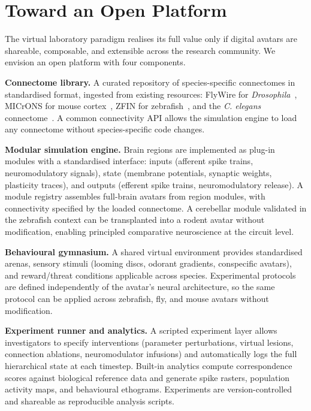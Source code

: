 \documentclass[12pt,a4paper]{article}
\begin{document}
\section*{Toward an Open Platform}

The virtual laboratory paradigm realises its full value only if
digital avatars are shareable, composable, and extensible across the
research community.
We envision an open platform with four components.

\textbf{Connectome library.}
A curated repository of species-specific connectomes in standardised
format, ingested from existing resources: FlyWire for
\textit{Drosophila}~\cite{dorkenwald2024}, MICrONS for mouse
cortex~\cite{microns2021}, ZFIN for zebrafish~\cite{bradford2022},
and the \textit{C. elegans} connectome~\cite{white1986}.
A common connectivity API allows the simulation engine to load any
connectome without species-specific code changes.

\textbf{Modular simulation engine.}
Brain regions are implemented as plug-in modules with a standardised
interface: inputs (afferent spike trains, neuromodulatory signals),
state (membrane potentials, synaptic weights, plasticity traces), and
outputs (efferent spike trains, neuromodulatory release).
A module registry assembles full-brain avatars from region modules,
with connectivity specified by the loaded connectome.
A cerebellar module validated in the zebrafish context can be
transplanted into a rodent avatar without modification, enabling
principled comparative neuroscience at the circuit level.

\textbf{Behavioural gymnasium.}
A shared virtual environment provides standardised arenas, sensory
stimuli (looming discs, odorant gradients, conspecific avatars), and
reward/threat conditions applicable across species.
Experimental protocols are defined independently of the avatar's
neural architecture, so the same protocol can be applied across
zebrafish, fly, and mouse avatars without modification.

\textbf{Experiment runner and analytics.}
A scripted experiment layer allows investigators to specify
interventions (parameter perturbations, virtual lesions, connection
ablations, neuromodulator infusions) and automatically logs the full
hierarchical state at each timestep.
Built-in analytics compute correspondence scores against biological
reference data and generate spike rasters, population activity maps,
and behavioural ethograms.
Experiments are version-controlled and shareable as reproducible
analysis scripts.
\end{document}
